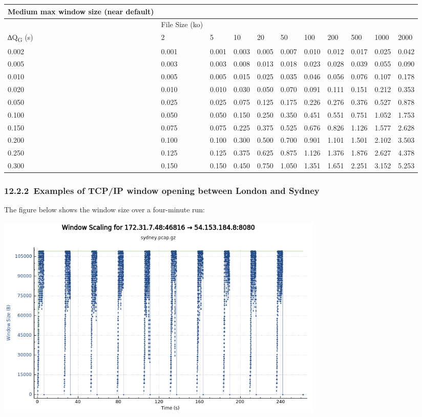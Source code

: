 \documentclass[]{article}
\begin{document}
\begin{longtable}[]{@{}lllllllllll@{}}
\toprule
Medium max window size (near default) & & & & & & & & & &\tabularnewline
\midrule
\endhead
& File Size (ko) & & & & & & & & &\tabularnewline
∆Q\textbar{}\textsubscript{G} (s) & 2 & 5 & 10 & 20 & 50 & 100 & 200 &
500 & 1000 & 2000\tabularnewline
0.002 & 0.001 & 0.001 & 0.003 & 0.005 & 0.007 & 0.010 & 0.012 & 0.017 &
0.025 & 0.042\tabularnewline
0.005 & 0.003 & 0.003 & 0.008 & 0.013 & 0.018 & 0.023 & 0.028 & 0.039 &
0.055 & 0.090\tabularnewline
0.010 & 0.005 & 0.005 & 0.015 & 0.025 & 0.035 & 0.046 & 0.056 & 0.076 &
0.107 & 0.178\tabularnewline
0.020 & 0.010 & 0.010 & 0.030 & 0.050 & 0.070 & 0.091 & 0.111 & 0.151 &
0.212 & 0.353\tabularnewline
0.050 & 0.025 & 0.025 & 0.075 & 0.125 & 0.175 & 0.226 & 0.276 & 0.376 &
0.527 & 0.878\tabularnewline
0.100 & 0.050 & 0.050 & 0.150 & 0.250 & 0.350 & 0.451 & 0.551 & 0.751 &
1.052 & 1.753\tabularnewline
0.150 & 0.075 & 0.075 & 0.225 & 0.375 & 0.525 & 0.676 & 0.826 & 1.126 &
1.577 & 2.628\tabularnewline
0.200 & 0.100 & 0.100 & 0.300 & 0.500 & 0.700 & 0.901 & 1.101 & 1.501 &
2.102 & 3.503\tabularnewline
0.250 & 0.125 & 0.125 & 0.375 & 0.625 & 0.875 & 1.126 & 1.376 & 1.876 &
2.627 & 4.378\tabularnewline
0.300 & 0.150 & 0.150 & 0.450 & 0.750 & 1.050 & 1.351 & 1.651 & 2.251 &
3.152 & 5.253\tabularnewline
\bottomrule
\end{longtable}

\hypertarget{examples-of-tcpip-window-opening-between-london-and-sydney}{%
\subsubsection{​12.2.2​~Examples of TCP/IP window opening between London
and Sydney
}\label{examples-of-tcpip-window-opening-between-london-and-sydney}}

The figure below shows the window size over a four-minute run:

\includegraphics[width=6.27083in,height=3.88889in]{./media/image1.png}
\end{document}

